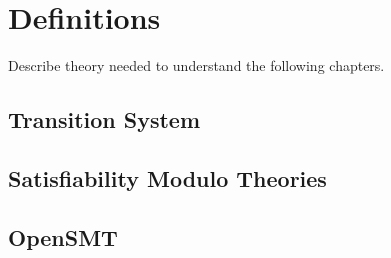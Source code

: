 
\chapter{Definitions}

Describe theory needed to understand the following chapters.

\section{Transition System}

\section{Satisfiability Modulo Theories}

\section{OpenSMT}

